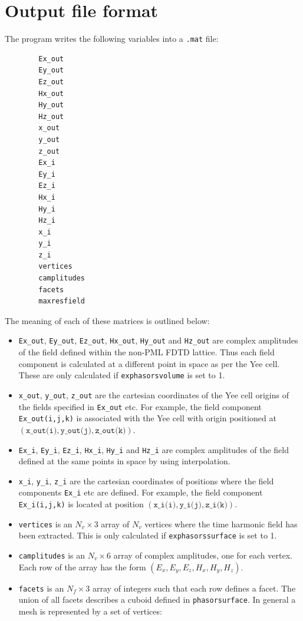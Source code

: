 \documentclass[a4paper, 12pt]{article}
\begin{document}
	\section{Output file format}
	The program writes the following variables into a \verb+.mat+ file:
	\begin{verbatim}
		Ex_out
		Ey_out
		Ez_out
		Hx_out
		Hy_out
		Hz_out
		x_out
		y_out
		z_out
		Ex_i
		Ey_i
		Ez_i
		Hx_i
		Hy_i
		Hz_i
		x_i
		y_i
		z_i
		vertices
		camplitudes
		facets
		maxresfield
	\end{verbatim}
	The meaning of each of these matrices is outlined below:
	\begin{itemize}
		\item \verb+Ex_out+, \verb+Ey_out+, \verb+Ez_out+, \verb+Hx_out+,
		\verb+Hy_out+ and \verb+Hz_out+ are complex amplitudes of the field
		defined within the non-PML FDTD lattice. Thus each field component is
		calculated at a different point in space as per the Yee cell. These
		are only calculated if \verb+exphasorsvolume+ is set to 1.
		\item \verb+x_out+, \verb+y_out+, \verb+z_out+ are the cartesian
		coordinates of the Yee cell origins of the fields specified in
		\verb+Ex_out+ etc. For example, the field component
		\verb+Ex_out(i,j,k)+ is associated with the Yee cell with origin
		positioned at
		$(\texttt{x\_out(i)},\texttt{y\_out(j)},\texttt{z\_out(k)})$.
		\item \verb+Ex_i+, \verb+Ey_i+, \verb+Ez_i+, \verb+Hx_i+,
		\verb+Hy_i+ and \verb+Hz_i+ are complex amplitudes of the field
		defined at the same points in space by using interpolation.
		\item \verb+x_i+, \verb+y_i+, \verb+z_i+ are the cartesian
		coordinates of positions where the field components \verb+Ex_i+ etc
		are defined. For example, the field component
		\verb+Ex_i(i,j,k)+ is located at position
		$(\texttt{x\_i(i)},\texttt{y\_i(j)},\texttt{z\_i(k)})$.
		\item \verb+vertices+ is an $N_v\times 3$ array of $N_v$ vertices where the
		time harmonic field has been extracted. This is only calculated if
		\verb+exphasorssurface+ is set to 1. 
		\item \verb+camplitudes+ is an $N_v\times 6$ array of complex
		amplitudes, one for each vertex. Each row of the array has the form
		$(E_x,E_y,E_z,H_x,H_y,H_z)$.
		\item \verb+facets+ is an $N_f\times 3$ array of integers such that
		each row defines a facet. The union of all facets describes a cuboid
		defined in \verb+phasorsurface+. In general a mesh is represented by a set of vertices:

\end{itemize}
\end{document}
